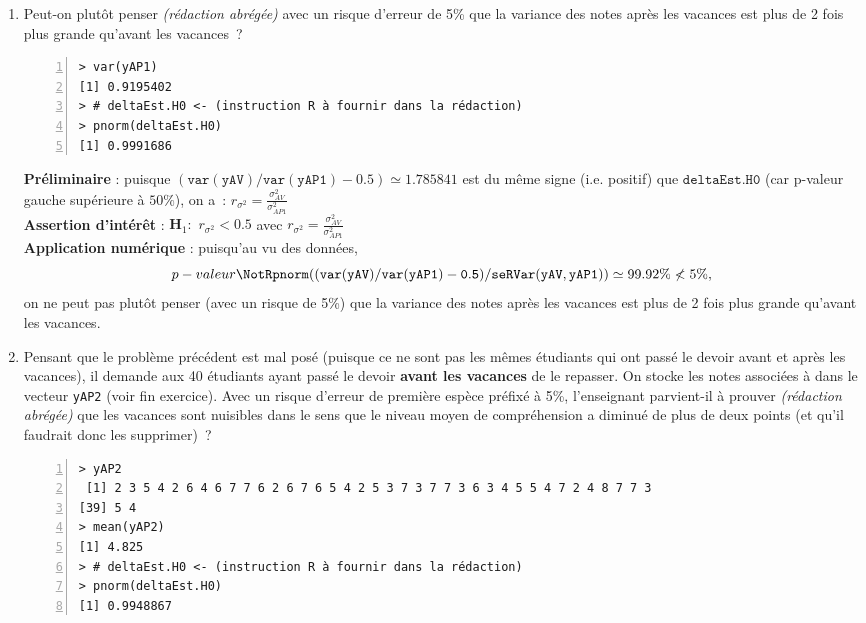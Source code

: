 \documentclass[10pt]{report}
\newcommand{\redabr}{\textit{(rédaction abrégée) }}
\begin{document}
\begin{exercice}
\begin{enumerate}
\item 
Peut-on plutôt penser \redabr avec un risque d'erreur de 5\% que la variance des notes après les vacances est plus de 2 fois plus grande qu'avant les vacances~?

\IndicR
\begin{Verbatim}[frame=leftline,fontfamily=tt,fontshape=n,numbers=left]
> var(yAP1)
[1] 0.9195402
> # deltaEst.H0 <- (instruction R à fournir dans la rédaction)
> pnorm(deltaEst.H0)
[1] 0.9991686
\end{Verbatim}

 

\begin{Correction}
\noindent \textbf{Préliminaire} : puisque $\mathtt{(var(yAV)/var(yAP1)-0.5)}\simeq1.785841$ est du même signe (i.e. positif) que $\mathtt{deltaEst.H0}$ (car p-valeur gauche supérieure à $50\%$), on a~: 
       $r_{\sigma^2}=\displaystyle \frac{\sigma^2_{AV}}{\sigma^2_{AP1}}$\\
\noindent \textbf{Assertion d'intérêt} :  $\mathbf{H}_1:$ $r_{\sigma^2}<0.5$ avec  $r_{\sigma^2}=\displaystyle \frac{\sigma^2_{AV}}{\sigma^2_{AP1}}$ \\
\textbf{Application numérique} :  puisqu'au vu des données, 
  \[
p-valeur\NotR\mathtt{pnorm((var(yAV)/var(yAP1)-0.5)/seRVar(yAV,yAP1))} \simeq 99.92\%\nless5\%,
\]
on ne peut pas plutôt penser (avec un risque de 5\%) que la variance des notes après les vacances est plus de 2 fois plus grande qu'avant les vacances.
\end{Correction}








\item 
Pensant que le problème précédent est mal posé (puisque ce ne sont pas les mêmes étudiants qui ont passé le devoir avant et après les vacances), il demande aux 40 étudiants ayant passé le devoir \textbf{avant les vacances} de le repasser. On stocke les notes associ{\'e}es {\`a} dans le vecteur \texttt{yAP2} (voir fin exercice). Avec un risque d'erreur de premi{\`e}re esp{\`e}ce pr{\'e}fix{\'e} {\`a} 5\%, l'enseignant parvient-il à prouver \redabr que les vacances sont nuisibles dans le sens que le niveau moyen de compréhension a diminué de plus de deux points (et qu'il faudrait donc les supprimer)~?

\IndicR
\begin{Verbatim}[frame=leftline,fontfamily=tt,fontshape=n,numbers=left]
> yAP2
 [1] 2 3 5 4 2 6 4 6 7 7 6 2 6 7 6 5 4 2 5 3 7 3 7 7 3 6 3 4 5 5 4 7 2 4 8 7 7 3
[39] 5 4
> mean(yAP2)
[1] 4.825
> # deltaEst.H0 <- (instruction R à fournir dans la rédaction)
> pnorm(deltaEst.H0)
[1] 0.9948867
\end{Verbatim}


\end{enumerate}
\end{exercice}
\end{document}
